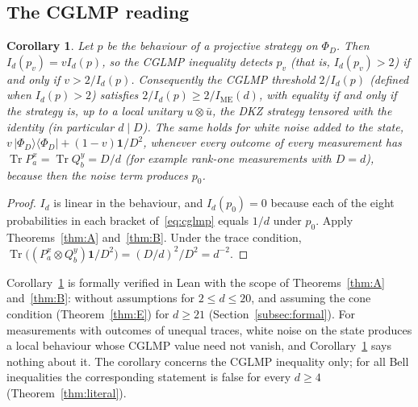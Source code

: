 \documentclass[11pt]{amsart}
\newtheorem{corollary}[theorem]{Corollary}
\theoremstyle{definition}
\theoremstyle{remark}
\numberwithin{equation}{section}
\newcommand{\Tr}{\operatorname{Tr}}
\newcommand{\IME}{I_{\mathrm{ME}}}
\newcommand{\one}{\mathbf{1}}
\begin{document}
\subsection{The CGLMP reading}\label{subsec:cglmpnoise}
\begin{corollary}\label{cor:noise}
Let $p$ be the behaviour of a projective strategy on $\Phi_D$. Then $I_d(p_v)=vI_d(p)$, so the CGLMP inequality detects
$p_v$ (that is, $I_d(p_v)>2$) if and only if $v>2/I_d(p)$. Consequently the CGLMP threshold $2/I_d(p)$ (defined when
$I_d(p)>2$) satisfies $2/I_d(p)\ge2/\IME(d)$, with equality if and only if the strategy is, up to a local unitary
$u\otimes\bar u$, the DKZ strategy tensored with the identity (in particular $d\mid D$). The same holds for white noise
added to the state, $v\,|\Phi_D\rangle\langle\Phi_D|+(1-v)\one/D^2$, whenever every outcome of every measurement has
$\Tr P^x_a=\Tr Q^y_b=D/d$ (for example rank-one measurements with $D=d$), because then the noise term produces $p_0$.
\end{corollary}

\begin{proof}
$I_d$ is linear in the behaviour, and $I_d(p_0)=0$ because each of the eight probabilities in each bracket
of~\eqref{eq:cglmp} equals $1/d$ under $p_0$. Apply Theorems~\ref{thm:A} and~\ref{thm:B}. Under the trace condition,
$\Tr\bigl((P^x_a\otimes Q^y_b)\one/D^2\bigr)=(D/d)^2/D^2=d^{-2}$.
\end{proof}

Corollary~\ref{cor:noise} is formally verified in Lean with the scope of Theorems~\ref{thm:A} and~\ref{thm:B}: without
assumptions for $2\le d\le20$, and assuming the cone condition (Theorem~\ref{thm:E}) for $d\ge21$
(Section~\ref{subsec:formal}). For measurements with outcomes of unequal traces, white noise on the state produces a
local behaviour whose CGLMP value need not vanish, and Corollary~\ref{cor:noise} says nothing about it. The corollary
concerns the CGLMP inequality only; for all Bell inequalities the corresponding statement is false for every $d\ge4$
(Theorem~\ref{thm:literal}).
\end{document}
